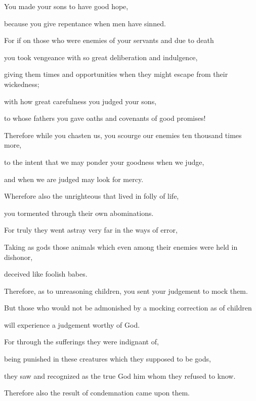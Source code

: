 {\par }{\Q You made your sons to have good hope,
\par }{\QB because you give repentance when men have sinned.
\par }{\Q {}For if on those who were enemies of your servants and due to death
\par }{\QB you took vengeance with so great deliberation and indulgence,
\par }{\QB giving them times and opportunities when they might escape from their wickedness;
\par }{\Q {}with how great carefulness you judged your sons,
\par }{\QB to whose fathers you gave oaths and covenants of good promises!
\par }{\Q {}Therefore while you chasten us, you scourge our enemies ten thousand times more,
\par }{\QB to the intent that we may ponder your goodness when we judge,
\par }{\QB and when we are judged may look for mercy.
\par }{\Q {}Wherefore also the unrighteous that lived in folly of life,
\par }{\QB you tormented through their own abominations.
\par }{\Q {}For truly they went astray very far in the ways of error,
\par }{\QB Taking as gods those animals which even among their enemies were held in dishonor,
\par }{\QB deceived like foolish babes.
\par }{\Q {}Therefore, as to unreasoning children, you sent your judgement to mock them.
\par }{\Q {}But those who would not be admonished by a mocking correction as of children
\par }{\QB will experience a judgement worthy of God.
\par }{\Q {}For through the sufferings they were indignant of,
\par }{\QB being punished in these creatures which they supposed to be gods,
\par }{\QB they saw and recognized as the true God him whom they refused to know.
\par }{\QB Therefore also the result of condemnation came upon them.
\par }{\BB \par }
